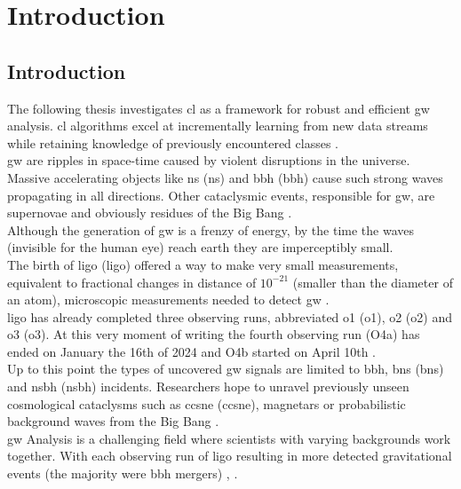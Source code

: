 \chapter{Introduction}
\label{ch:1}
\section{Introduction}
\label{sec-Introduction}
The following thesis investigates \acrlong{cl} as a framework for robust and efficient \acrlong{gw} analysis. \acrshort{cl} algorithms excel at incrementally learning from new data streams while retaining knowledge of previously encountered classes \citep{van2022three, qu2021recent, de2021continual}.\\
\acrshort{gw} are ripples in space-time caused by violent disruptions in the universe. Massive accelerating objects like \acrlong{ns} (\acrshort{ns}) and \acrlong{bbh} (\acrshort{bbh}) cause such strong waves propagating in all directions. Other cataclysmic events, responsible for \acrshort{gw}, are supernovae and obviously residues of the Big Bang \citep{CaltechWhatAreGW}. \\
Although the generation of \acrshort{gw} is a frenzy of energy, by the time the waves (invisible for the human eye) reach earth they are imperceptibly small.\\
The birth of \acrshort{ligo} (\acrlong{ligo}) offered a way to make very small measurements, equivalent to fractional changes in distance of $10^{-21}$ (smaller than the diameter of an atom), microscopic measurements needed to detect \acrshort{gw} \citep{zevin2017gravity,glanzer2023data}. \\
\acrshort{ligo} has already completed three observing runs, abbreviated \acrshort{o1} (\acrlong{o1}), \acrshort{o2} (\acrlong{o2}) and \acrshort{o3} (\acrlong{o3}). At this very moment of writing the fourth observing run (O4a) has ended on January the 16th of 2024 and O4b started on April 10th  \citep{LIGORunPlan}. \\
Up to this point the types of uncovered \acrshort{gw} signals are limited to \acrshort{bbh}, \acrlong{bns} (\acrshort{bns}) and \acrlong{nsbh} (\acrshort{nsbh}) incidents. Researchers hope to unravel previously unseen cosmological cataclysms such as \acrshort{ccsne} (\acrlong{ccsne}), magnetars or probabilistic background waves from the Big Bang \citep{cuoco2020enhancing}. \\
\acrshort{gw} Analysis is a challenging field where scientists with varying backgrounds work together. With each observing run of \acrshort{ligo} resulting in more detected gravitational events (the majority were \acrshort{bbh} mergers) \citep{zevin2017gravity,glanzer2023data}, \citep{CaltechFAQ}. 

